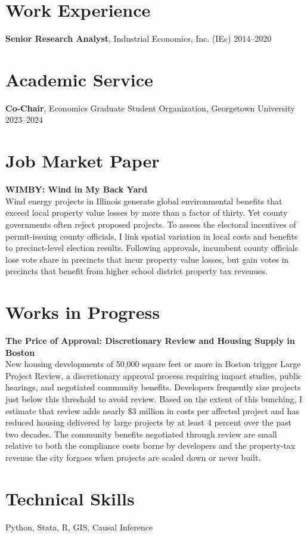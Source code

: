 \documentclass[11pt]{article}
\begin{document}
\section*{Work Experience}

\textbf{Senior Research Analyst}, Industrial Economics, Inc. (IEc) \hfill 2014–2020

\section*{Academic Service}

\textbf{Co-Chair}, Economics Graduate Student Organization, Georgetown University \hfill 2023–2024

\section*{Job Market Paper}

\textbf{WIMBY: Wind in My Back Yard} \\
Wind energy projects in Illinois generate global environmental benefits that exceed local property value losses by more than a factor of thirty. Yet county governments often reject proposed projects. To assess the electoral incentives of permit-issuing county officials, I link spatial variation in local costs and benefits to precinct-level election results. Following approvals, incumbent county officials lose vote share in precincts that incur property value losses, but gain votes in precincts that benefit from higher school district property tax revenues.
\section*{Works in Progress}
\textbf{The Price of Approval: Discretionary Review and Housing Supply in Boston} \\
New housing developments of 50,000 square feet or more in Boston trigger Large Project Review, a discretionary approval process requiring impact studies, public hearings, and negotiated community benefits. Developers frequently size projects just below this threshold to avoid review. Based on the extent of this bunching, I estimate that review adds nearly \$3 million in costs per affected project and has reduced housing delivered by large projects by at least 4 percent over the past two decades. The community benefits negotiated through review are small relative to both the compliance costs borne by developers and the property-tax revenue the city forgoes when projects are scaled down or never built. 



\section*{Technical Skills}
Python, Stata, R, GIS, Causal Inference

\end{document}
